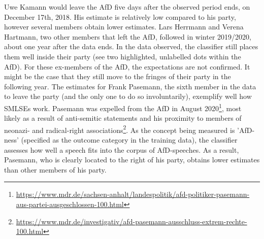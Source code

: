 \documentclass{article}
\begin{document}
Uwe Kamann would leave the AfD five days after the observed period ends, on December 17th, 2018. His estimate is relatively low compared to his party, however several members obtain lower estimates. Lars Herrmann and Verena Hartmann, two other members that left the AfD, followed in winter 2019/2020, about one year after the data ends. In the data observed, the classifier still places them well inside their party (see two highlighted, unlabelled dots within the AfD). For these ex-members of the AfD, the expectations are not confirmed. It might be the case that they still move to the fringes of their party in the following year. The estimates for Frank Pasemann, the sixth member in the data to leave the party (and the only one to do so involuntarily), exemplify well how SMLSEs work. Pasemann was expelled from the AfD in August 2020\footnote{\href{https://www.mdr.de/sachsen-anhalt/landespolitik/afd-politiker-pasemann-aus-partei-ausgeschlossen-100.html}{https://www.mdr.de/sachsen-anhalt/landespolitik/afd-politiker-pasemann-aus-partei-ausgeschlossen-100.html}}, most likely as a result of anti-semitic statements and his proximity to members of neonazi- and radical-right associations\footnote{\href{https://www.mdr.de/investigativ/afd-pasemann-ausschluss-extrem-rechte-100.html}{https://www.mdr.de/investigativ/afd-pasemann-ausschluss-extrem-rechte-100.html}}. As the concept being measured is 'AfD-ness' (specified as the outcome category in the training data), the classifier assesses how well a speech fits into the corpus of AfD-speeches. As a result, Pasemann, who is clearly located to the right of his party, obtains lower estimates than other members of his party.\par
\end{document}
